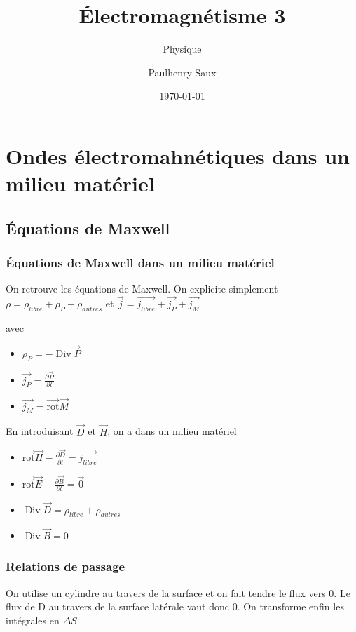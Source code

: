 \documentclass[french]{yLectureNote}
\title{Électromagnétisme 3}
\subtitle{Physique}
\author{Paulhenry Saux}
\date{\today}
\renewcommand{\vec}{\overrightarrow}
\DeclareMathOperator{\Div}{Div}
\newcommand{\rot}{\vec{\mathrm{rot}}}
\begin{document}
\setcounter{chapter}{4}
\chapter{Ondes électromahnétiques dans un milieu matériel}
\section{Équations de Maxwell}
\subsection{Équations de Maxwell dans un milieu matériel}
On retrouve les équations de Maxwell. On explicite simplement $\rho = \rho_{libre}+\rho_P+\rho_{autres}$ et $\vec{j} = \vec{j_{libre}}+\vec{j_P}+\vec{j_M}$

avec 
\begin{itemize}
    \item $\rho_P = -\Div \vec{P}$
    \item $\vec{j_P} = \frac{\partial \vec{P}}{\partial t}$
    \item $\vec{j_M} = \rot \vec{M}$
\end{itemize}
En introduisant $\vec{D}$ et $\vec{H}$, on a dans un milieu matériel
\begin{itemize}
    \item $\rot \vec{H} - \frac{\partial \vec{D}}{\partial t}=\vec{j_{libre}}$
    \item $\rot \vec{E}+\frac{\partial \vec{B}}{\partial t} = \vec{0}$
    \item $\Div \vec{D} = \rho_{libre}+\rho_{autres}$
    \item $\Div \vec{B} = 0$
\end{itemize}
\subsection{Relations de passage}
On utilise un cylindre au travers de la surface et on fait tendre le flux vers 0. 
Le flux de D au travers de la surface latérale vaut donc 0.
On transforme enfin les intégrales en $\Delta S$


\end{document}
